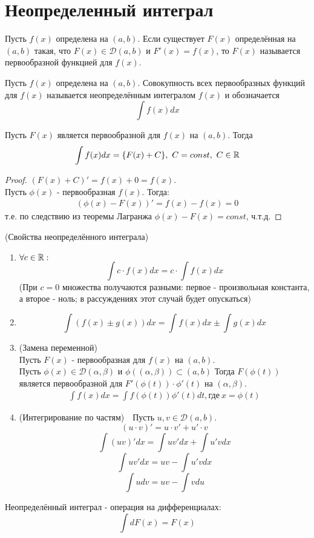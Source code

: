 \section{Неопределенный интеграл}
\begin{definition}
    Пусть $f(x)$ определена на $(a, b)$. Если существует $F(x)$ определённая на $(a, b)$ такая, что $F(x) \in \mathcal{D}(a, b)$ и $F'(x) = f(x)$, то $F(x)$ называется первообразной функцией для $f(x)$.
\end{definition}
\begin{definition}
    Пусть $f(x)$ определена на $(a, b)$. Совокупность всех первообразных функций для $f(x)$ называется неопределённым интегралом $f(x)$ и обозначается 
    \[\int f(x)dx\]
\end{definition}
\begin{theorem}
    Пусть $F(x)$ является первообразной для $f(x)$ на $(a, b)$. Тогда
    \[\int f(x)dx = \{F(x) + C\},\ C = const, \ C\in\mathbb{R}\]
\end{theorem}
\begin{proof}
    $(F(x) + C)' = f(x) + 0 = f(x)$.\\
    Пусть $\phi(x)$ -  первообразная $f(x)$. Тогда:
    \begin{align*}
        (\phi(x) - F(x))' = f(x) - f(x) = 0
    \end{align*}
    т.е. по следствию из теоремы Лагранжа $\phi(x) - F(x) = const$, ч.т.д.
\end{proof}
\begin{statement} (Свойства неопределённого интеграла)
\begin{enumerate}
    \item $\forall c \in \mathbb{R}: $
    \[\int c\cdot f(x)dx = c\cdot \int f(x)dx\]
    (При $c = 0$ множества получаются разными: первое - произвольная константа, а второе - ноль; в рассуждениях этот случай будет опускаться)
    \item \[\int (f(x) \pm g(x))dx = \int f(x) dx \pm \int g(x) dx\]
    \item (Замена переменной)\\
    Пусть $F(x)$ - первообразная для $f(x)$ на $(a, b)$.\\
    Пусть $\phi(x) \in \mathcal{D}(\alpha, \beta)$ и $\phi((\alpha, \beta)) \subset (a, b)$
    Тогда $F(\phi(t))$ является первообразной для $F'(\phi(t))\cdot\phi'(t)$ на $(\alpha, \beta)$.
    \begin{align*}
        \int f(x) dx = \int f(\phi(t))\phi'(t) dt ,\text{где} \ x = \phi(t)
    \end{align*}
    \item (Интегрирование по частям)\ \ Пусть $u,v \in \mathcal{D}(a, b)$.
    \[(u\cdot v)' = u\cdot v' + u'\cdot v\]
    \[\int(uv)'dx = \int uv' dx + \int u'v dx\]
    \[\int uv' dx = uv - \int u'v dx\]
    \[\int udv = uv - \int vdu\]
\end{enumerate}
\end{statement}
\begin{comm}
    Неопределённый интеграл - операция на дифференциалах: 
    \[\int dF(x) = F(x)\]
\end{comm}
